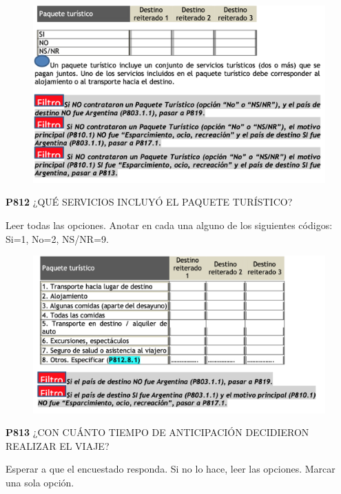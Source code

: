 \documentclass[
  openany]{book}
\begin{document}
\begin{figure}

{\centering \includegraphics[width=1\linewidth]{imagenes/figura6-266} 

}

\end{figure}

\textbf{P812} ¿QUÉ SERVICIOS INCLUYÓ EL PAQUETE TURÍSTICO?

Leer todas las opciones. Anotar en cada una alguno de los siguientes códigos: Si=1, No=2, NS/NR=9.

\begin{figure}

{\centering \includegraphics[width=1\linewidth]{imagenes/figura6-267} 

}

\end{figure}

\textbf{P813} ¿CON CUÁNTO TIEMPO DE ANTICIPACIÓN DECIDIERON REALIZAR EL VIAJE?

Esperar a que el encuestado responda. Si no lo hace, leer las opciones. Marcar una sola opción.
\end{document}
